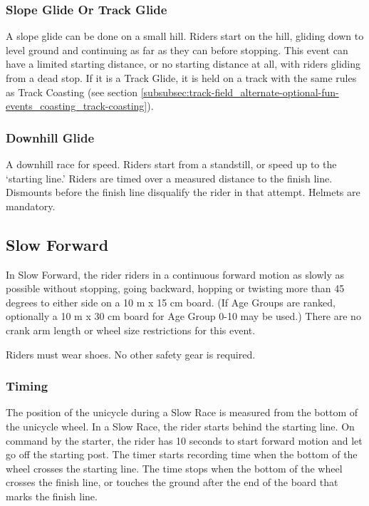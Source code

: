 \subsubsection{Slope Glide Or Track Glide}
A slope glide can be done on a small hill.
Riders start on the hill, gliding down to level ground and continuing as far as they can before stopping.
This event can have a limited starting distance, or no starting distance at all, with riders gliding from a dead stop.
If it is a Track Glide, it is held on a track with the same rules as Track Coasting (see section \ref{subsubsec:track-field_alternate-optional-fun-events_coasting_track-coasting}).

\subsubsection{Downhill Glide}
A downhill race for speed.
Riders start from a standstill, or speed up to the `starting line.'
Riders are timed over a measured distance to the finish line.
Dismounts before the finish line disqualify the rider in that attempt.
Helmets are mandatory.

\subsection{Slow Forward}

In Slow Forward, the rider riders in a continuous forward motion as slowly as possible without stopping, going backward, hopping or twisting more than 45 degrees to either side on a 10 m x 15 cm board.
(If Age Groups are ranked, optionally a 10 m x 30 cm board for Age Group 0-10 may be used.)
There are no crank arm length or wheel size restrictions for this event.

Riders must wear shoes.
No other safety gear is required.

\subsubsection{Timing}
The position of the unicycle during a Slow Race is measured from the bottom of the unicycle wheel.
In a Slow Race, the rider starts behind the starting line.
On command by the starter, the rider has 10 seconds to start forward motion and let go off the starting post.
The timer starts recording time when the bottom of the wheel crosses the starting line.
The time stops when the bottom of the wheel crosses the finish line, or touches the ground after the end of the board that marks the finish line.


